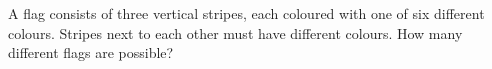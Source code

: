 A flag consists of three vertical stripes, each coloured with one of six different colours. Stripes next to each other must have different colours. How many different flags are possible?
